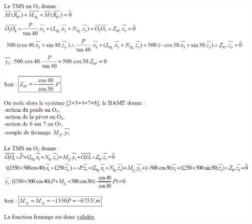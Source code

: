 \documentclass[10pt,fleqn]{article} %
\begin{document}
\begin{center}
\includegraphics[width=\linewidth]{images/cor_03}
\end{center}
\end{document}
